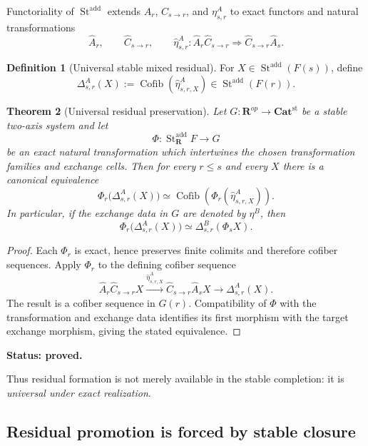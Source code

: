 \documentclass[11pt]{article}
\newtheorem{theorem}{Theorem}[section]
\theoremstyle{definition}
\newtheorem{definition}[theorem]{Definition}
\theoremstyle{remark}
\newcommand{\Rcat}{\mathbf R}
\newcommand{\Cofib}{\operatorname{Cofib}}
\newcommand{\status}[1]{\textbf{Status: #1.}}
\begin{document}
Functoriality of $\operatorname{St}^{\mathrm{add}}$ extends $A_r$, $C_{s\to r}$, and $\eta^A_{s,r}$ to exact functors and natural transformations
\[
\widehat A_r,
\qquad
\widehat C_{s\to r},
\qquad
\widehat\eta^A_{s,r}:
\widehat A_r\widehat C_{s\to r}
\Longrightarrow
\widehat C_{s\to r}\widehat A_s.
\]

\begin{definition}[Universal stable mixed residual]\label{def:universal-residual}
For $X\in\operatorname{St}^{\mathrm{add}}(F(s))$, define
\[
\Delta^A_{s,r}(X)
:=
\Cofib\!\left(
\widehat\eta^A_{s,r,X}
\right)
\in
\operatorname{St}^{\mathrm{add}}(F(r)).
\]
\end{definition}

\begin{theorem}[Universal residual preservation]\label{thm:residual-preservation}
Let $G:\Rcat^{op}\to\mathbf{Cat}^{\mathrm{st}}$ be a stable two-axis system and let
\[
\Phi:\operatorname{St}^{\mathrm{add}}_{\Rcat}F\longrightarrow G
\]
be an exact natural transformation which intertwines the chosen transformation families and exchange cells. Then for every $r\le s$ and every $X$ there is a canonical equivalence
\[
\Phi_r\bigl(\Delta^A_{s,r}(X)\bigr)
\simeq
\Cofib\!\left(
\Phi_r(\widehat\eta^A_{s,r,X})
\right).
\]
In particular, if the exchange data in $G$ are denoted by $\eta^B$, then
\[
\Phi_r\bigl(\Delta^A_{s,r}(X)\bigr)
\simeq
\Delta^B_{s,r}(\Phi_sX).
\]
\end{theorem}

\begin{proof}
Each $\Phi_r$ is exact, hence preserves finite colimits and therefore cofiber sequences. Apply $\Phi_r$ to the defining cofiber sequence
\[
\widehat A_r\widehat C_{s\to r}X
\xrightarrow{\widehat\eta^A_{s,r,X}}
\widehat C_{s\to r}\widehat A_sX
\longrightarrow
\Delta^A_{s,r}(X).
\]
The result is a cofiber sequence in $G(r)$. Compatibility of $\Phi$ with the transformation and exchange data identifies its first morphism with the target exchange morphism, giving the stated equivalence.
\end{proof}

\status{proved}

Thus residual formation is not merely available in the stable completion: it is \emph{universal under exact realization}.

\subsection{Residual promotion is forced by stable closure}
\end{document}

